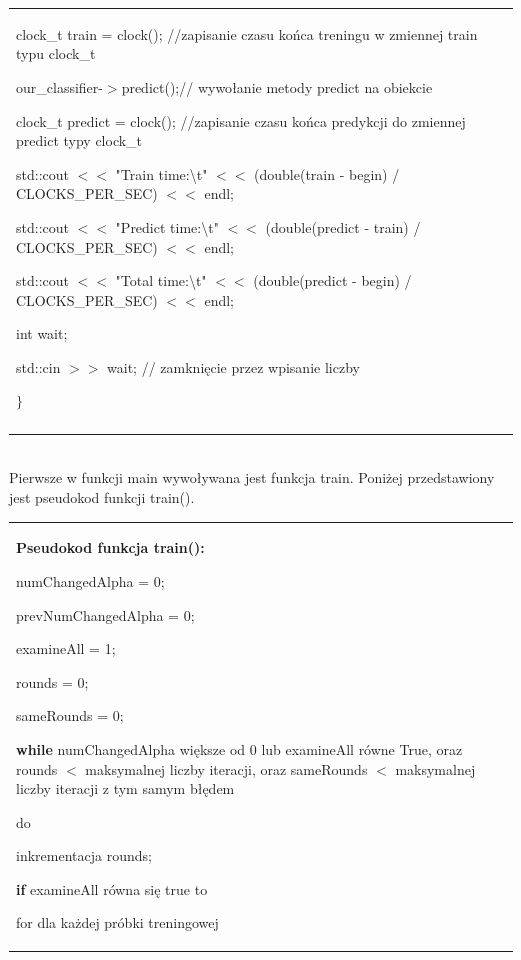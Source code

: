 \documentclass[[10pt,a4paper]{article}
\begin{document}
\begin{enumerate}
\begin{itemize}
\begin{tabular}{|p{11.5cm}|}
 clock\_t train = clock(); //zapisanie czasu ko\'{n}ca treningu w zmiennej train typu clock\_t

 our\_classifier-$>$predict();// wywo{\l}anie metody predict na obiekcie

 clock\_t predict = clock(); //zapisanie czasu ko\'{n}ca predykcji do zmiennej predict typy clock\_t

 std::cout $<$$<$ "Train time:{\textbackslash}t" $<$$<$ (double(train - begin) / CLOCKS\_PER\_SEC) $<$$<$ endl;

 std::cout $<$$<$ "Predict time:{\textbackslash}t" $<$$<$ (double(predict - train) / CLOCKS\_PER\_SEC) $<$$<$ endl;

 std::cout $<$$<$ "Total time:{\textbackslash}t" $<$$<$ (double(predict - begin) / CLOCKS\_PER\_SEC) $<$$<$ endl;

 int wait;

 std::cin $>$$>$ wait; // zamkni\k{e}cie przez wpisanie liczby

\noindent 

\noindent $\}$
\\\\ \hline
\end{tabular}
\\
Pierwsze w funkcji main wywoływana jest funkcja train. Poniżej przedstawiony jest pseudokod funkcji train().\\
\begin{tabular}{|p{11.5cm}|} \hline
\noindent \textbf{Pseudokod funkcja train():}

 numChangedAlpha = 0;

 prevNumChangedAlpha = 0;

 examineAll = 1;

 rounds = 0;

 sameRounds = 0;

\noindent \textbf{while} numChangedAlpha większe od 0 lub examineAll równe True, oraz rounds $<$ maksymalnej liczby iteracji, oraz sameRounds $<$ maksymalnej liczby iteracji z tym samym błędem

 \hspace{1em}do 

  \hspace{2em}inkrementacja rounds;

  \hspace{2em}\textbf{if} examineAll równa się true to

   \hspace{3em}for dla ka\.{z}dej próbki treningowej


\end{tabular}
\end{itemize}
\end{enumerate}
\end{document}
